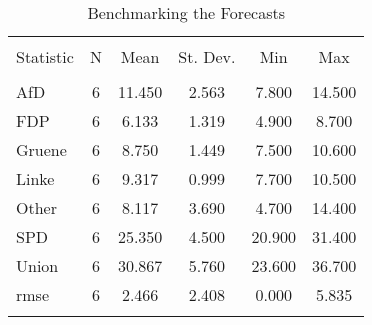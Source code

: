 
\begin{table}[!htbp] \centering 
  \caption{Benchmarking the Forecasts} 
  \label{} 
\begin{tabular}{@{\extracolsep{5pt}}lccccc} 
\\[-1.8ex]\hline 
\hline \\[-1.8ex] 
Statistic & \multicolumn{1}{c}{N} & \multicolumn{1}{c}{Mean} & \multicolumn{1}{c}{St. Dev.} & \multicolumn{1}{c}{Min} & \multicolumn{1}{c}{Max} \\ 
\hline \\[-1.8ex] 
AfD & 6 & 11.450 & 2.563 & 7.800 & 14.500 \\ 
FDP & 6 & 6.133 & 1.319 & 4.900 & 8.700 \\ 
Gruene & 6 & 8.750 & 1.449 & 7.500 & 10.600 \\ 
Linke & 6 & 9.317 & 0.999 & 7.700 & 10.500 \\ 
Other & 6 & 8.117 & 3.690 & 4.700 & 14.400 \\ 
SPD & 6 & 25.350 & 4.500 & 20.900 & 31.400 \\ 
Union & 6 & 30.867 & 5.760 & 23.600 & 36.700 \\ 
rmse & 6 & 2.466 & 2.408 & 0.000 & 5.835 \\ 
\hline \\[-1.8ex] 
\end{tabular} 
\end{table} 
